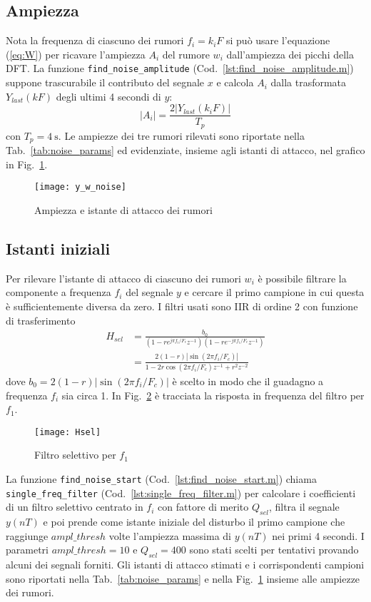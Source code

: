 \documentclass{article}
\newcommand{\fig}[1]{Fig.~\ref{#1}}
\newcommand{\cod}[1]{Cod.~\ref{#1}}
\newcommand{\tab}[1]{Tab.~\ref{#1}}
\newcommand{\eqn}[1]{(\ref{#1})}
\newcommand{\inlcd}[1]{\lstinline[basicstyle=\ttfamily,keywordstyle={}]{#1}}
\begin{document}
\subsection{Ampiezza}
Nota la frequenza di ciascuno dei rumori $f_i = k_iF$ si può usare
l'equazione \eqn{eq:W} per ricavare l'ampiezza $A_i$ del rumore $w_i$
dall'ampiezza dei picchi della DFT.  La funzione
\inlcd{find_noise_amplitude} (\cod{lst:find_noise_amplitude.m})
suppone trascurabile il contributo del segnale $x$ e calcola $A_i$
dalla trasformata $Y_\mathit{last}(kF)$ degli ultimi 4 secondi di $y$:
\begin{equation}
  |A_i| = \frac{2|Y_\mathit{last}(k_iF)|}{T_p}
\end{equation}
con $T_p = \SI{4}{\s}$. Le ampiezze dei tre rumori rilevati sono
riportate nella \tab{tab:noise_params} ed evidenziate, insieme agli
istanti di attacco, nel grafico in \fig{plot:y_w_noises}.

\begin{figure}[h]
  \centering
  \texttt{[image: y\_w\_noise]}
  \caption{Ampiezza e istante di attacco dei rumori}
  \label{plot:y_w_noises}
\end{figure}

\subsection{Istanti iniziali}
Per rilevare l'istante di attacco di ciascuno dei rumori $w_i$ è
possibile filtrare la componente a frequenza $f_i$ del segnale $y$ e
cercare il primo campione in cui questa è sufficientemente diversa da
zero. I filtri usati sono IIR di ordine 2 con funzione di
trasferimento
\begin{align}
  H_\mathit{sel} &= \frac{b_0}{
    (1 - re^{j\pi f_i/F_c}z^{-1})
    (1 - re^{-j\pi f_i/F_c}z^{-1})} \\
  &= \frac{2(1-r)|\sin(2\pi f_i/F_c)|}
  {1 - 2r\cos(2\pi f_i/F_c)z^{-1} + r^2z^{-2}}
\end{align}
dove $b_0 = 2(1-r)|\sin(2\pi f_i/F_c)|$ è scelto in modo che il
guadagno a frequenza $f_i$ sia circa 1. In \fig{plot:Hsel} è tracciata
la risposta in frequenza del filtro per $f_1$.

\begin{figure}[h]
  \centering
  \texttt{[image: Hsel]}
  \caption{Filtro selettivo per $f_1$}
  \label{plot:Hsel}
\end{figure}

La funzione \inlcd{find_noise_start} (\cod{lst:find_noise_start.m})
chiama \inlcd{single_freq_filter} (\cod{lst:single_freq_filter.m}) per
calcolare i coefficienti di un filtro selettivo centrato in $f_i$ con
fattore di merito $Q_\mathit{sel}$, filtra il segnale $y(nT)$ e poi
prende come istante iniziale del disturbo il primo campione che
raggiunge $\mathit{ampl\_thresh}$ volte l'ampiezza massima di $y(nT)$ nei
primi 4 secondi. I parametri $\mathit{ampl\_thresh} = 10$ e $Q_\mathit{sel}
= 400$ sono stati scelti per tentativi provando alcuni dei segnali
forniti.  Gli istanti di attacco stimati e i corrispondenti campioni
sono riportati nella \tab{tab:noise_params} e nella
\fig{plot:y_w_noises} insieme alle ampiezze dei rumori.
\end{document}

